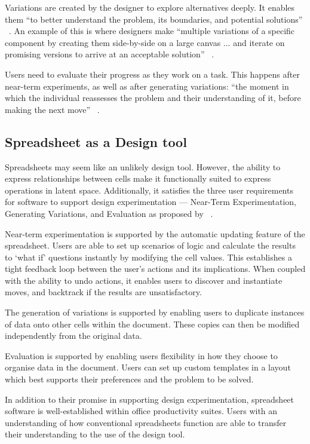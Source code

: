 \documentclass[letterpaper]{article}
\begin{document}
Variations are created by the designer to explore alternatives deeply. It enables them ``to better understand the problem, its boundaries, and potential solutions'' ~\cite[p. 40]{terry02}. An example of this is where designers make ``multiple variations of a specific component by creating them side-by-side on a large canvas ... and iterate on promising versions to arrive at an acceptable solution'' ~\cite[p. 40]{terry02}.

Users need to evaluate their progress as they work on a task. This happens after near-term experiments, as well as after generating variations: ``the moment in which the individual reassesses the problem and their understanding of it, before making the next move'' ~\cite[p. 40]{terry02}.

\subsection{Spreadsheet as a Design tool}

Spreadsheets may seem like an unlikely design tool. However, the ability to express relationships between cells make it functionally suited to express operations in latent space. 
Additionally, it satisfies the three user requirements for software to support design experimentation — Near-Term Experimentation, Generating Variations, and Evaluation as proposed by ~\cite{terry02}.

Near-term experimentation is supported by the automatic updating feature of the spreadsheet. Users are able to set up scenarios of logic and calculate the results to ‘what if’ questions instantly by modifying the cell values. This establishes a tight feedback loop between the user’s actions and its implications. When coupled with the ability to undo actions, it enables users to discover and instantiate moves, and backtrack if the results are unsatisfactory.

The generation of variations is supported by enabling users to duplicate instances of data onto other cells within the document. These copies can then be modified independently from the original data.

Evaluation is supported by enabling users flexibility in how they choose to organise data in the document. Users can set up custom templates in a layout which best supports their preferences and the problem to be solved.

In addition to their promise in supporting design experimentation, spreadsheet software is well-established within office productivity suites. Users with an understanding of how conventional spreadsheets function are able to transfer their understanding to the use of the design tool.
\end{document}
